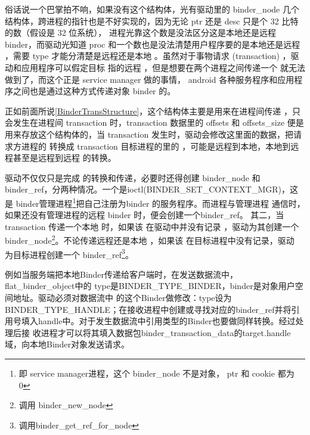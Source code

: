 \documentclass[a4paper,11pt]{article}
\begin{document}
俗话说一个巴掌拍不响，如果没有这个结构体，光有驱动里的
binder_node 几个结构体，跨进程的指针也是不好实现的，因为无论 ptr 还是 desc
只是个 32 比特的数（假设是 32 位系统），
进程光靠这个数是没法区分这是本地还是远程 binder，而驱动光知道 proc
和一个数也是没法清楚用户程序要的是本地还是远程 \binder，需要 type
才能分清楚是远程还是本地 \binder 。虽然对于事物请求 (transaction)
，驱动和应用程序可以假定目标 \binder 指的远程 \binder
，但是想要在两个进程之间传递一个 \binder 就无法做到了，而这个正是 service manager 做的事情， android
各种服务程序和应用程序之间也是通过这种方式传递对象 binder
的。

正如前面所说\autoref{BinderTransStructure}，这个结构体主要是用来在进程间传递 \binder
，只会发生在进程间 transaction 时，transaction 数据里的 offsets 和
offsets_size 便是用来存放这个结构体的，当 transaction
发生时，驱动会修改这里面的数据，把请求方进程的 \binder 转换成 transaction
目标进程的里的 \binder，可能是远程到本地，本地到远程甚至是远程到远程 \binder
的转换。

驱动不仅仅只是完成 \binder 的转换和传递，必要时还得创建 binder_node 和
binder_ref，分两种情况。一个是ioctl(BINDER_SET_CONTEXT_MGR)，这是
binder管理进程\footnote{即 service manager进程，这个 binder_node 不是对象，
ptr 和 cookie 都为 0}把自己注册为binder 的服务程序。而进程与管理进程
通信时，如果还没有管理进程的远程 binder 时，便会创建一个binder_ref。
其二，当transaction 传递一个本地 \binder 时，如果该 \binder 在驱动中并没有记录
，驱动为其创建一个 binder_node\footnote{调用 binder_new_node }。不论传递远程还是本地
\binder，如果该 \binder 在目标进程中没有记录，驱动
为目标进程创建一个 binder_ref\footnote{调用binder_get_ref_for_node}。

例如当服务端把本地Binder传递给客户端时，在发送数据流中，flat_binder_object中的
type是BINDER_TYPE_BINDER，binder是\binder 对象用户空间地址。驱动必须对数据流中
的这个Binder做修改：type设为BINDER_TYPE_HANDLE；在接收进程中创建或寻找对应的binder_ref并将引
用号填入handle中。对于发生数据流中引用类型的Binder也要做同样转换。经过处理后接
收进程才可以将其填入数据包binder_transaction_data的target.handle域，向本地Binder对象发送请求。
\end{document}
